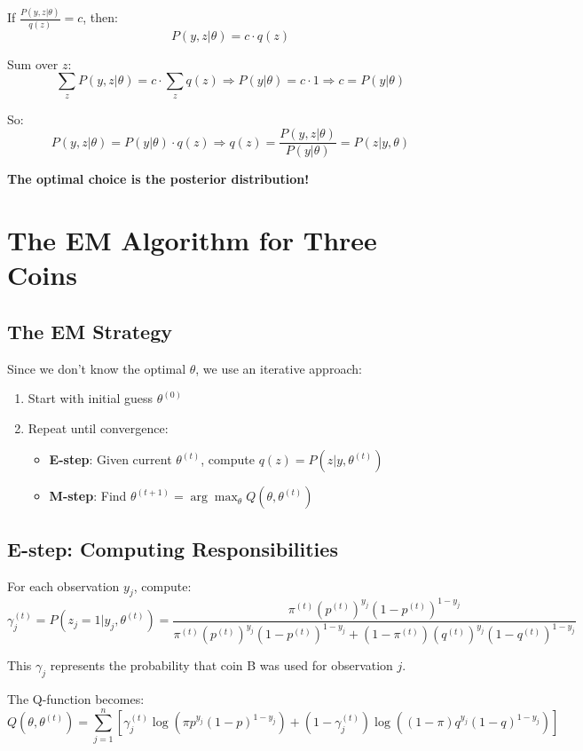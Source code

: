 \begin{notechapter}
If $\frac{P(y,z|\theta)}{q(z)} = c$, then:
\[
P(y,z|\theta) = c \cdot q(z)
\]

Sum over $z$:
\[
\sum_z P(y,z|\theta) = c \cdot \sum_z q(z) \Rightarrow P(y|\theta) = c \cdot 1 \Rightarrow c = P(y|\theta)
\]

So:
\[
P(y,z|\theta) = P(y|\theta) \cdot q(z) \Rightarrow q(z) = \frac{P(y,z|\theta)}{P(y|\theta)} = P(z|y,\theta)
\]

\textbf{The optimal choice is the posterior distribution!}

\section{The EM Algorithm for Three Coins}

\subsection{The EM Strategy}

Since we don't know the optimal $\theta$, we use an iterative approach:

\begin{enumerate}
    \item Start with initial guess $\theta^{(0)}$
    \item Repeat until convergence:
    \begin{itemize}
        \item \textbf{E-step}: Given current $\theta^{(t)}$, compute $q(z) = P(z|y,\theta^{(t)})$
        \item \textbf{M-step}: Find $\theta^{(t+1)} = \arg\max_{\theta} Q(\theta, \theta^{(t)})$
    \end{itemize}
\end{enumerate}

\subsection{E-step: Computing Responsibilities}

For each observation $y_j$, compute:
\[
\gamma_j^{(t)} = P(z_j = 1|y_j, \theta^{(t)}) = \frac{\pi^{(t)} (p^{(t)})^{y_j}(1-p^{(t)})^{1-y_j}}{\pi^{(t)} (p^{(t)})^{y_j}(1-p^{(t)})^{1-y_j} + (1-\pi^{(t)}) (q^{(t)})^{y_j}(1-q^{(t)})^{1-y_j}}
\]

This $\gamma_j$ represents the probability that coin B was used for observation $j$.

The Q-function becomes:
\[
Q(\theta, \theta^{(t)}) = \sum_{j=1}^n \left[\gamma_j^{(t)} \log(\pi p^{y_j}(1-p)^{1-y_j}) + (1-\gamma_j^{(t)}) \log((1-\pi) q^{y_j}(1-q)^{1-y_j})\right]
\]


\end{notechapter}
